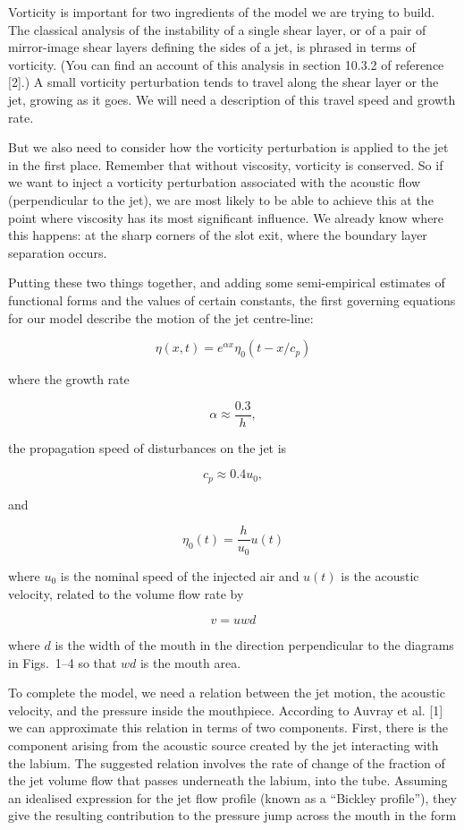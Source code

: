   Vorticity is important for two ingredients of the model we are trying to 
  build. The classical analysis of the instability of a single shear layer, or 
  of a pair of mirror-image shear layers defining the sides of a jet, is 
  phrased in terms of vorticity. (You can find an account of this analysis in 
  section 10.3.2 of reference [2].) A small vorticity perturbation tends to 
  travel along the shear layer or the jet, growing as it goes. We will need a 
  description of this travel speed and growth rate. 

  But we also need to consider how the vorticity perturbation is applied to the 
  jet in the first place. Remember that without viscosity, vorticity is 
  conserved. So if we want to inject a vorticity perturbation associated with 
  the acoustic flow (perpendicular to the jet), we are most likely to be able 
  to achieve this at the point where viscosity has its most significant 
  influence. We already know where this happens: at the sharp corners of the 
  slot exit, where the boundary layer separation occurs. 

  Putting these two things together, and adding some semi-empirical estimates 
  of functional forms and the values of certain constants, the first governing 
  equations for our model describe the motion of the jet centre-line: 

  $$\eta(x,t)=e^{\alpha x} \eta_0(t-x/c_p) \tag{1}$$ 

  where the growth rate 

  $$\alpha \approx \dfrac{0.3}{h}, \tag{2}$$ 

  the propagation speed of disturbances on the jet is 

  $$c_p \approx 0.4 u_0 , \tag{3}$$ 

  and 

  $$\eta_0(t)=\dfrac{h}{u_0} u(t) \tag{4}$$ 

  where $u_0$ is the nominal speed of the injected air and $u(t)$ is the 
  acoustic velocity, related to the volume flow rate by 

  $$v=u w d \tag{5}$$ 

  where $d$ is the width of the mouth in the direction perpendicular to the 
  diagrams in Figs.\ 1--4 so that $wd$ is the mouth area. 

  To complete the model, we need a relation between the jet motion, the 
  acoustic velocity, and the pressure inside the mouthpiece. According to 
  Auvray et al. [1] we can approximate this relation in terms of two 
  components. First, there is the component arising from the acoustic source 
  created by the jet interacting with the labium. The suggested relation 
  involves the rate of change of the fraction of the jet volume flow that 
  passes underneath the labium, into the tube. Assuming an idealised expression 
  for the jet flow profile (known as a ``Bickley profile''), they give the 
  resulting contribution to the pressure jump across the mouth in the form 

